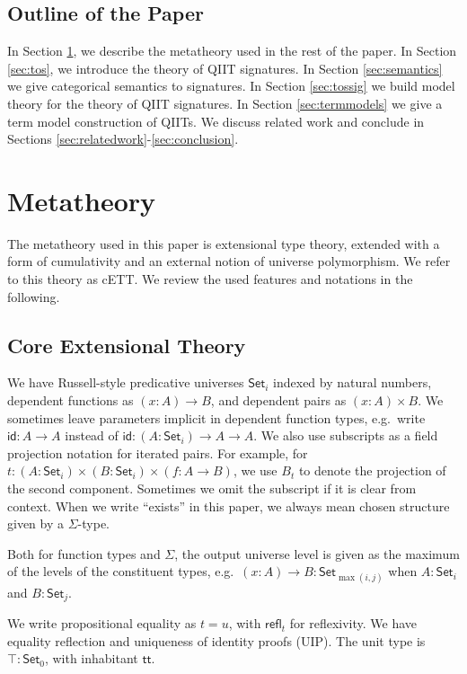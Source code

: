 \documentclass{article}
\theoremstyle{definition}
\theoremstyle{theorem}
\newcommand{\refl}{\mathsf{refl}}
\newcommand{\id}{\mathsf{id}}
\renewcommand{\tt}{\mathsf{tt}}
\newcommand{\ra}{\rightarrow}
\newcommand{\Set}{\mathsf{Set}}
\begin{document}
\subsection{Outline of the Paper}

In Section \ref{sec:metatheory}, we describe the metatheory used in the rest of
the paper. In Section \ref{sec:tos}, we introduce the theory of QIIT
signatures. In Section \ref{sec:semantics} we give categorical semantics to
signatures. In Section \ref{sec:tossig} we build model theory for the theory
of QIIT signatures. In Section \ref{sec:termmodels} we give a term model construction
of QIITs. We discuss related work and conclude in Sections \ref{sec:relatedwork}-\ref{sec:conclusion}.

\section{Metatheory}
\label{sec:metatheory}

The metatheory used in this paper is extensional type theory, extended with a
form of cumulativity and an external notion of universe polymorphism. We refer
to this theory as cETT. We review the used features and notations
in the following.

\subsection{Core Extensional Theory}

We have Russell-style predicative universes $\Set_i$ indexed by natural numbers,
dependent functions as $(x : A)\ra B$, and dependent pairs as $(x : A)\times
B$. We sometimes leave parameters implicit in dependent function types,
e.g.\ write $\id : A \ra A$ instead of $\id : (A : \Set_i)\ra A \ra A$. We also
use subscripts as a field projection notation for iterated pairs. For example,
for $t : (A : \Set_i) \times (B : \Set_i) \times (f : A \ra B)$, we use $B_t$ to
denote the projection of the second component. Sometimes we omit the subscript
if it is clear from context. When we write ``exists'' in this paper, we always
mean chosen structure given by a $\Sigma$-type.

Both for function types and $\Sigma$, the output universe level is given as the
maximum of the levels of the constituent types, e.g.\ $(x : A)\ra B : \Set_{\max(i,j)}$
when $A : \Set_i$ and $B : \Set_j$.

We write propositional equality as $t = u$, with $\refl_t$ for reflexivity. We
have equality reflection and uniqueness of identity proofs (UIP). The unit type
is $\top : \Set_0$, with inhabitant $\tt$.
\end{document}
